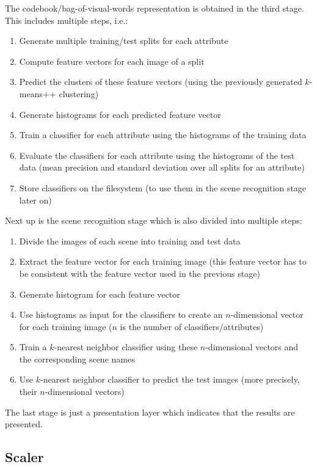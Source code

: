 \documentclass{vldb}
\begin{document}
The codebook/bag-of-visual-words representation is obtained in the third stage.
This includes multiple steps, i.e.: 
\begin{enumerate}
  \item Generate multiple training/test splits for each attribute
  \item Compute feature vectors for each image of a split
  \item Predict the clusters of these feature vectors (using the previously
    generated $k$-means++ clustering)
  \item Generate histograms for each predicted feature vector
  \item Train a classifier for each attribute using the histograms of the training
    data
  \item Evaluate the classifiers for each attribute using the histograms of the
    test data (mean precision and standard deviation over all splits for an
    attribute)
  \item Store classifiers on the filesystem (to use them in the scene
    recognition stage later on)
\end{enumerate}

Next up is the scene recognition stage which is also divided into multiple steps:
\begin{enumerate}
  \item Divide the images of each scene into training and test data
  \item Extract the feature vector for each training image (this feature vector
    has to be consistent with the feature vector used in the previous stage)
  \item Generate histogram for each feature vector 
  \item Use histograms as input for the classifiers to create an $n$-dimensional
    vector for each training image ($n$ is the number of classifiers/attributes)
  \item Train a $k$-nearest neighbor classifier using these $n$-dimensional
    vectors and the corresponding scene names
  \item Use $k$-nearest neighbor classifier to predict the test images (more
    precisely, their $n$-dimensional vectors)
\end{enumerate}

The last stage is just a presentation layer which indicates that the results are
presented.

\subsection{Scaler}
\label{subsec:scaler}
\end{document}
